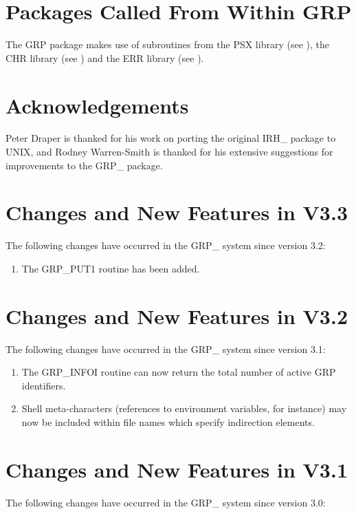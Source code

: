 \section{\label{APP:PACK}Packages Called From Within GRP}
The GRP package makes use of subroutines from the PSX
library (see ), the CHR library (see
) and the ERR library (see
).

\section{Acknowledgements}

Peter Draper is thanked for his work on porting the original IRH\_ package to
UNIX, and Rodney Warren-Smith is thanked for his extensive suggestions for
improvements to the GRP\_ package.

\section{Changes and New Features in V3.3}
The following changes have occurred in the GRP\_ system since version 3.2:

\begin{enumerate}
\item The GRP\_PUT1 routine has been added.
\end{enumerate}

\section{Changes and New Features in V3.2}
The following changes have occurred in the GRP\_ system since version 3.1:

\begin{enumerate}
\item The GRP\_INFOI routine can now return the total number of active
GRP identifiers.
\item Shell meta-characters (references to environment variables, for
instance) may now be included within file names which specify
indirection elements.

\end{enumerate}

\section{Changes and New Features in V3.1}
The following changes have occurred in the GRP\_ system since version 3.0:

